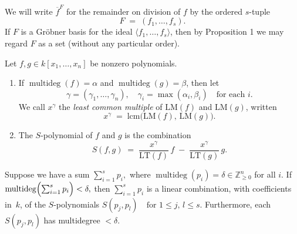 \begin{definition}\label{def:Remainder} %
    We will write \(\overline{f}^F\) for the remainder on division of \(f\) by the ordered \(s\)-tuple
    \[
    F \;=\;(f_1,\dots,f_s).
    \]
    If \(F\) is a Gr{\"o}bner basis for the ideal \(\langle f_1,\dots,f_s\rangle\), then by Proposition 1
    we may regard \(F\) as a set (without any particular order).
\end{definition}

\begin{definition}\label{def:S-polynomial} %
    \leanok %
    Let \(f,g\in k[x_1,\dots,x_n]\) be nonzero polynomials.
    \begin{enumerate}
      \item If \(\operatorname{multideg}(f)=\alpha\) and \(\operatorname{multideg}(g)=\beta\), 
        then let 
        \[
          \gamma = (\gamma_1,\dots,\gamma_n),
          \quad
          \gamma_i = \max(\alpha_i,\beta_i)
          \quad\text{for each }i.
        \]
        We call \(x^\gamma\) the \emph{least common multiple} of \(\mathrm{LM}(f)\) and \(\mathrm{LM}(g)\),
        written
        \[
          x^\gamma \;=\;\mathrm{lcm}\bigl(\mathrm{LM}(f),\,\mathrm{LM}(g)\bigr).
        \]
      \item The \(S\)-polynomial of \(f\) and \(g\) is the combination
        \[
          S(f,g)
          \;=\;
          \frac{x^\gamma}{\mathrm{LT}(f)}\,f
          \;-\;
          \frac{x^\gamma}{\mathrm{LT}(g)}\,g.
        \]
    \end{enumerate}
\end{definition}

\begin{lemma}\label{lem:exists_S_polynomial_syzygies} %
    \leanok %
    Suppose we have a sum $\sum_{i=1}^s p_i,$ where $\operatorname{multideg}(p_i)=\delta\in\mathbb Z_{\ge0}^n$ for all $i$.
    If $\operatorname{multideg}\Bigl(\sum_{i=1}^s p_i\Bigr)<\delta,$ then $\sum_{i=1}^s p_i$ is a linear combination, with coefficients in~$k$, of the $S$-polynomials $S(p_j,p_l)\quad\text{for }1\le j,\,l\le s$.
    Furthermore, each $S(p_j,p_l)$ has multidegree $<\delta$.
\end{lemma}

